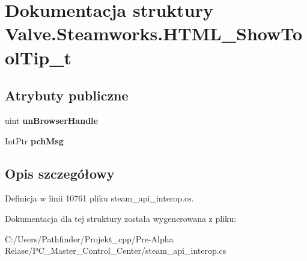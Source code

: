 \hypertarget{struct_valve_1_1_steamworks_1_1_h_t_m_l___show_tool_tip__t}{}\section{Dokumentacja struktury Valve.\+Steamworks.\+H\+T\+M\+L\+\_\+\+Show\+Tool\+Tip\+\_\+t}
\label{struct_valve_1_1_steamworks_1_1_h_t_m_l___show_tool_tip__t}
\subsection*{Atrybuty publiczne}
\begin{DoxyCompactItemize}
\item 
\mbox{\label{struct_valve_1_1_steamworks_1_1_h_t_m_l___show_tool_tip__t_a3fb6e79e2dd3b0d1dc31ddd0cdee3727}} 
uint {\bfseries un\+Browser\+Handle}
\item 
\mbox{\label{struct_valve_1_1_steamworks_1_1_h_t_m_l___show_tool_tip__t_a2c569cfc20f5773b2f84986350c6c3a2}} 
Int\+Ptr {\bfseries pch\+Msg}
\end{DoxyCompactItemize}


\subsection{Opis szczegółowy}


Definicja w linii 10761 pliku steam\+\_\+api\+\_\+interop.\+cs.



Dokumentacja dla tej struktury została wygenerowana z pliku\+:\begin{DoxyCompactItemize}
\item 
C\+:/\+Users/\+Pathfinder/\+Projekt\+\_\+cpp/\+Pre-\/\+Alpha Relase/\+P\+C\+\_\+\+Master\+\_\+\+Control\+\_\+\+Center/steam\+\_\+api\+\_\+interop.\+cs\end{DoxyCompactItemize}

